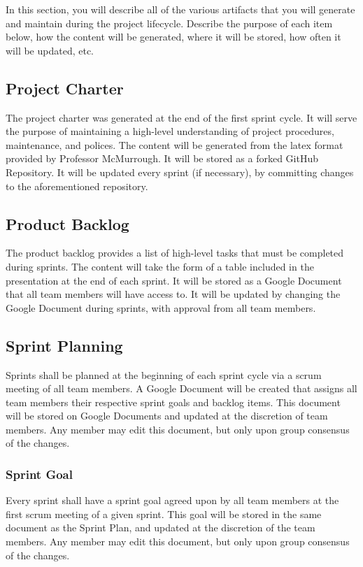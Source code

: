 In this section, you will describe all of the various artifacts that you will generate and maintain during the project lifecycle. Describe the purpose of each item below, how the content will be generated, where it will be stored, how often it will be updated, etc.
\subsection{Project Charter}
The project charter was generated at the end of the first sprint cycle. It will serve the purpose of maintaining a high-level understanding of project procedures, maintenance, and polices. The content will be generated from the latex format provided by Professor McMurrough. It will be stored as a forked GitHub Repository. It will be updated every sprint (if necessary), by committing changes to the aforementioned repository.

\subsection{Product Backlog}
The product backlog provides a list of high-level tasks that must be completed during sprints. The content will take the form of a table included in the presentation at the end of each sprint. It will be stored as a Google Document that all team members will have access to. It will be updated by changing the Google Document during sprints, with approval from all team members. 

\subsection{Sprint Planning}
Sprints shall be planned at the beginning of each sprint cycle via a scrum meeting of all team members. A Google Document will be created that assigns all team members their respective sprint goals and backlog items. This document will be stored on Google Documents and updated at the discretion of team members. Any member may edit this document, but only upon group consensus of the changes.

\subsubsection{Sprint Goal}
Every sprint shall have a sprint goal agreed upon by all team members at the first scrum meeting of a given sprint. This goal will be stored in the same document as the Sprint Plan, and updated at the discretion of the team members. Any member may edit this document, but only upon group consensus of the changes.

